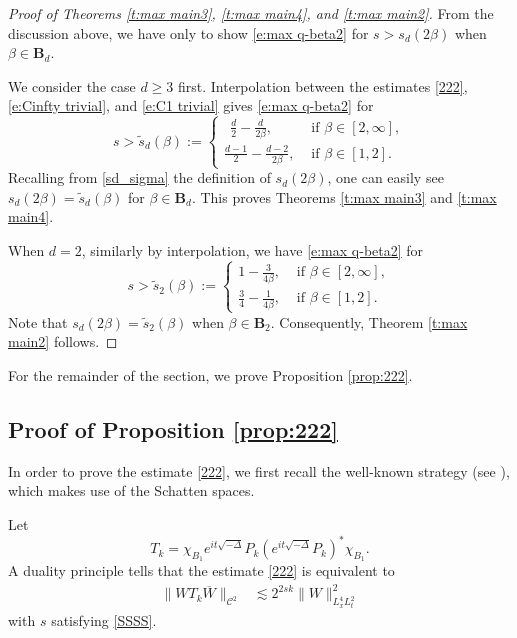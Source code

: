 \documentclass[a4paper]{amsart}
\numberwithin{figure}{section}
\numberwithin{equation}{section}%
\theoremstyle{plain}%
\theoremstyle{definition}
\theoremstyle{remark}%
\begin{document}
\begin{proof}[Proof of Theorems \ref{t:max main3}, \ref{t:max main4}, and \ref{t:max main2}] 
From the discussion above, we have only to show \eqref{e:max q-beta2} for $s>s_d(2\beta)$ when $\beta \in \mathbf B_d$.

We consider the case $d\ge3$ first. Interpolation  between the estimates \eqref{222}, \eqref{e:Cinfty trivial}, and \eqref{e:C1 trivial} gives \eqref{e:max q-beta2} for
\[
s>  \tilde s_{d}(\beta) :=\begin{cases}
	 \  \   \frac d2-\frac d{2\beta},  &\text{ if } \beta \in [2,\infty],\\[1ex]
\frac{d-1}2-\frac{d-2}{2\beta},  & \text{ if }  \beta \in [1,2].
\end{cases}
\]
Recalling from \eqref{sd_sigma} the definition of $s_d(2\beta)$, one can easily see $s_d(2\beta)=\tilde s_{d}(\beta)$ for $\beta\in \mathbf B_d$.  This proves Theorems \ref{t:max main3} and \ref{t:max main4}. 




When $d=2$,  similarly by interpolation,  we have \eqref{e:max q-beta2} for
\[
s>\tilde s_2(\beta):=\begin{cases}
1-\frac{3}{4\beta},   &\text{ if }  \beta \in [2,\infty],
\\[1ex]
\frac{3}4-\frac{1}{4\beta}, &\text{ if }  \beta \in [1,2].
\end{cases}
\]
Note that $s_d(2\beta)=\tilde s_2(\beta)$ when $\beta \in \mathbf B_2$. Consequently, Theorem \ref{t:max main2} follows. 
\end{proof}




For the remainder of the section, we prove Proposition \ref{prop:222}.



\subsection{Proof of Proposition \ref{prop:222}} 
 In order to prove the estimate  \eqref{222}, we first recall the well-known strategy (see \cite{FS_AJM, BHLNS}), which makes use of 
 the Schatten spaces. 

Let 
\[ T_k=\chi_{B_1}e^{it\sqrt{-\Delta}}P_k (e^{it\sqrt{-\Delta}}P_k )^*\chi_{B_1}.\]
A duality principle tells that the estimate  \eqref{222} is equivalent to 
\begin{align}
\|WT_{k} \overline W\|_{\mathcal C^2}
&\lesssim 2^{2sk}
\|W\|_{L_x^4L_t^2}^2 \label{c22}
\end{align}
with $s$ satisfying \eqref{SSSS}. 
\end{document}
